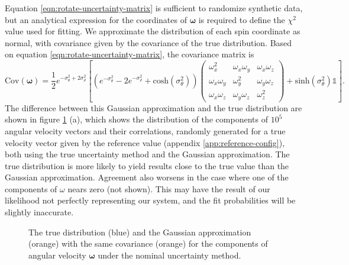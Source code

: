 \documentclass{aastex631}
\newcommand{\parens}[1]{\left( #1 \right)}
\newcommand{\brackets}[1]{\left[ #1 \right]}
\begin{document}
Equation \ref{eqn:rotate-uncertainty-matrix} is sufficient to randomize synthetic data, but an analytical expression for the coordinates of $\mathbf \omega$ is required to define the $\chi^2$ value used for fitting. We approximate the distribution of each spin coordinate as normal, with covariance given by the covariance of the true distribution. Based on equation \ref{eqn:rotate-uncertainty-matrix}, the covariance matrix is
\begin{equation}
\text{Cov}(\mathbf \omega) = \frac{1}{2}e^{-\sigma_\theta^2 + 2 \sigma_\rho^2}\brackets{\parens{e^{-\sigma_\theta^2}-2e^{-\sigma_\rho^2}+\textrm{cosh}(\sigma_\theta^2)} \parens{\begin{array}{ccc}
\omega_x^2 & \omega_x \omega_y& \omega_x \omega_z\\
\omega_x \omega_y & \omega_y^2 & \omega_y \omega_z\\
\omega_x \omega_z & \omega_y \omega_z& \omega_z^2
\end{array}} +  \mathrm{sinh}(\sigma_\theta^2) \mathds{1}}.
\label{eqn:rotate-uncertainty-var}
\end{equation}
The difference between this Gaussian approximation and the true distribution are shown in figure \ref{fig:nominal-spin-distro} (a), which shows the distribution of the components of $10^5$ angular velocity vectors and their correlations, randomly generated for a true velocity vector given by the reference value (appendix \ref{app:reference-config}), both using the true uncertainty method and the Gaussian approximation. The true distribution is more likely to yield results close to the true value than the Gaussian approximation. Agreement also worsens in the case where one of the components of $\omega$ nears zero (not shown). This may have the result of our likelihood not perfectly representing our system, and the fit probabilities will be slightly inaccurate.
\begin{figure}
  \centering
  \caption{The true distribution (blue) and the Gaussian approximation (orange) with the same covariance (orange)  for the components of angular velocity $\mathbf \omega$ under the nominal uncertainty method.}
  \label{fig:nominal-spin-distro}
\end{figure}
\end{document}
